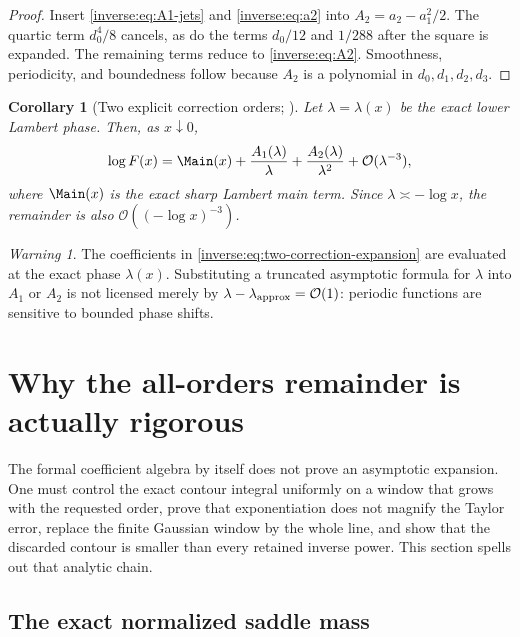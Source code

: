 \documentclass[11pt,oneside]{article}
\newtheorem{corollary}[corollary]{Corollary}
\theoremstyle{definition}
\theoremstyle{remark}
\newtheorem{warning}[warning]{Warning}
\newcommand{\bigO}{\mathcal O}
\begin{document}
\begin{proof}
Insert \eqref{inverse:eq:A1-jets} and \eqref{inverse:eq:a2} into
$A_2=a_2-a_1^2/2$.  The quartic term $d_0^4/8$ cancels, as do the
terms $d_0/12$ and $1/288$ after the square is expanded.  The remaining
terms reduce to \eqref{inverse:eq:A2}.  Smoothness, periodicity, and boundedness
follow because $A_2$ is a polynomial in $d_0,d_1,d_2,d_3$.
\end{proof}

\begin{corollary}[Two explicit correction orders; \Formalized]
\label{inverse:cor:two-corrections}
Let $\lambda=\lambda(x)$ be the exact lower Lambert phase.  Then, as
$x\downarrow0$,
\begin{equation}
 \log F(x)
 =\Main(x)+\frac{A_1(\lambda)}{\lambda}
          +\frac{A_2(\lambda)}{\lambda^2}
          +\bigO(\lambda^{-3}), \label{inverse:eq:two-correction-expansion}
\end{equation}
where $\Main(x)$ is the exact sharp Lambert main term.  Since
$\lambda\asymp-\log x$, the remainder is also
$\bigO((-\log x)^{-3})$.
\end{corollary}

\begin{warning}
The coefficients in \eqref{inverse:eq:two-correction-expansion} are evaluated at
the exact phase $\lambda(x)$.  Substituting a truncated asymptotic formula
for $\lambda$ into $A_1$ or $A_2$ is not licensed merely by
$\lambda-\lambda_{\rm approx}=\bigO(1)$: periodic functions are sensitive
to bounded phase shifts.
\end{warning}


\section{Why the all-orders remainder is actually rigorous}
\label{inverse:sec:all-orders-proof}

The formal coefficient algebra by itself does not prove an asymptotic
expansion.  One must control the exact contour integral uniformly on a
window that grows with the requested order, prove that exponentiation does
not magnify the Taylor error, replace the finite Gaussian window by the
whole line, and show that the discarded contour is smaller than every
retained inverse power.  This section spells out that analytic chain.

\subsection{The exact normalized saddle mass}
\end{document}
